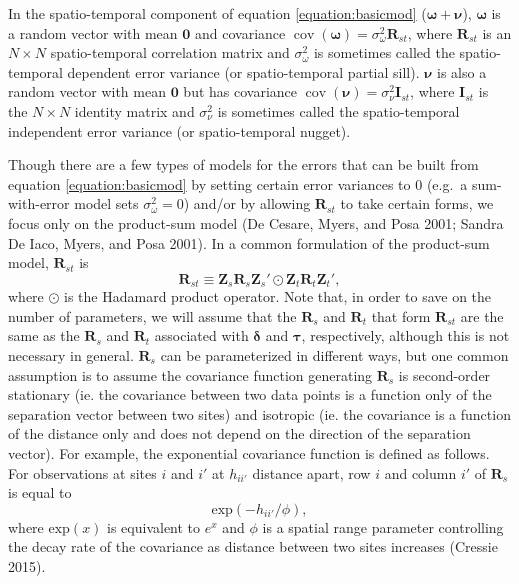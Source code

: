 \documentclass[smallextended]{svjour3}       %
\begin{document}
In the spatio-temporal component of equation \ref{equation:basicmod}
(\(\bm{\omega} + \bm{\nu}\)), \(\bm{\omega}\) is a random vector with
mean \(\mathbf{0}\) and covariance
\(\mathop{\mathrm{{cov}}}(\bm{\omega}) = \sigma^2_{\omega} \mathbf{R}_{st}\),
where \(\mathbf{R}_{st}\) is an \(N \times N\) spatio-temporal
correlation matrix and \(\sigma^2_{\omega}\) is sometimes called the
spatio-temporal dependent error variance (or spatio-temporal partial
sill). \(\bm{\nu}\) is also a random vector with mean \(\mathbf{0}\) but
has covariance
\(\mathop{\mathrm{{cov}}}(\bm{\nu}) = \sigma^2_{\nu} \mathbf{I}_{st}\),
where \(\mathbf{I}_{st}\) is the \(N \times N\) identity matrix and
\(\sigma^2_{\nu}\) is sometimes called the spatio-temporal independent
error variance (or spatio-temporal nugget).

Though there are a few types of models for the errors that can be built
from equation \ref{equation:basicmod} by setting certain error variances
to 0 (e.g.~a sum-with-error model sets \(\sigma^2_{\omega} = 0\)) and/or
by allowing \(\mathbf{R}_{st}\) to take certain forms, we focus only on
the product-sum model (De Cesare, Myers, and Posa 2001; Sandra De Iaco,
Myers, and Posa 2001). In a common formulation of the product-sum model,
\(\mathbf{R}_{st}\) is \mbox{} \begin{equation*}
\mathbf{R}_{st} \equiv \mathbf{Z}_{s} \mathbf{R}_{s} \mathbf{Z}_{s}' \odot \mathbf{Z}_t \mathbf{R}_t \mathbf{Z}_t',
\end{equation*} \noindent where \(\odot\) is the Hadamard product
operator. Note that, in order to save on the number of parameters, we
will assume that the \(\mathbf{R}_s\) and \(\mathbf{R}_t\) that form
\(\mathbf{R}_{st}\) are the same as the \(\mathbf{R}_s\) and
\(\mathbf{R}_t\) associated with \(\bm{\delta}\) and \(\bm{\tau}\),
respectively, although this is not necessary in general.
\(\mathbf{R}_s\) can be parameterized in different ways, but one common
assumption is to assume the covariance function generating
\(\mathbf{R}_s\) is second-order stationary (ie. the covariance between
two data points is a function only of the separation vector between two
sites) and isotropic (ie. the covariance is a function of the distance
only and does not depend on the direction of the separation vector). For
example, the exponential covariance function is defined as follows. For
observations at sites \(i\) and \(i'\) at \(h_{ii'}\) distance apart,
row \(i\) and column \(i'\) of \(\mathbf{R}_{s}\) is equal to \mbox{}
\begin{equation}
\label{equation:spatcov}
\text{exp}(-h_{ii'} / \phi),
\end{equation} \noindent where \(\text{exp}(x)\) is equivalent to
\(e^x\) and \(\phi\) is a spatial range parameter controlling the decay
rate of the covariance as distance between two sites increases (Cressie
2015).
\end{document}
